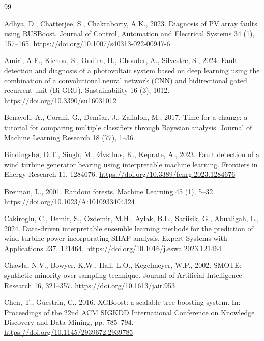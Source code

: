 \documentclass[11pt,a4paper]{article}
\begin{document}
\begin{thebibliography}{99}
\small

Adhya, D., Chatterjee, S., Chakraborty, A.K., 2023. Diagnosis of PV array faults using RUSBoost. Journal of Control, Automation and Electrical Systems 34 (1), 157--165. \url{https://doi.org/10.1007/s40313-022-00947-6}

Amiri, A.F., Kichou, S., Oudira, H., Chouder, A., Silvestre, S., 2024. Fault detection and diagnosis of a photovoltaic system based on deep learning using the combination of a convolutional neural network (CNN) and bidirectional gated recurrent unit (Bi-GRU). Sustainability 16 (3), 1012. \url{https://doi.org/10.3390/su16031012}

Benavoli, A., Corani, G., Dem\v{s}ar, J., Zaffalon, M., 2017. Time for a change: a tutorial for comparing multiple classifiers through Bayesian analysis. Journal of Machine Learning Research 18 (77), 1--36.

Bindingsb{\o}, O.T., Singh, M., {\O}vsthus, K., Keprate, A., 2023. Fault detection of a wind turbine generator bearing using interpretable machine learning. Frontiers in Energy Research 11, 1284676. \url{https://doi.org/10.3389/fenrg.2023.1284676}

Breiman, L., 2001. Random forests. Machine Learning 45 (1), 5--32. \url{https://doi.org/10.1023/A:1010933404324}

Cakiroglu, C., Demir, S., Ozdemir, M.H., Aylak, B.L., Sariisik, G., Abualigah, L., 2024. Data-driven interpretable ensemble learning methods for the prediction of wind turbine power incorporating SHAP analysis. Expert Systems with Applications 237, 121464. \url{https://doi.org/10.1016/j.eswa.2023.121464}

Chawla, N.V., Bowyer, K.W., Hall, L.O., Kegelmeyer, W.P., 2002. SMOTE: synthetic minority over-sampling technique. Journal of Artificial Intelligence Research 16, 321--357. \url{https://doi.org/10.1613/jair.953}

Chen, T., Guestrin, C., 2016. XGBoost: a scalable tree boosting system. In: Proceedings of the 22nd ACM SIGKDD International Conference on Knowledge Discovery and Data Mining, pp. 785--794. \url{https://doi.org/10.1145/2939672.2939785}


\end{thebibliography}
\end{document}
